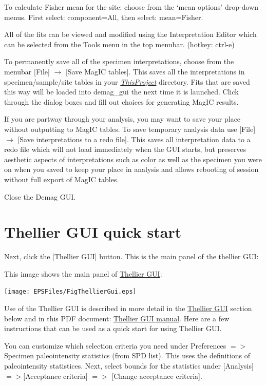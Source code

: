 \documentclass[11pt]{book}
\begin{document}
{{To calculate  Fisher mean for the site: choose from the `mean options' drop-down menus.  First select: component=All, then select: mean=Fisher.

All of the fits can be viewed and modified using the Interpretation Editor which can be selected from the Tools menu in the top menubar. (hotkey: ctrl-e)

To permanently save all of the specimen interpretations, choose from the menubar [File] $\rightarrow$ [Save MagIC  tables]. This saves all the interpretations in specimen/sample/site tables in your \href{#Project_Directory}{\it ThisProject} directory. Fits that are saved this way will be loaded into demag\_gui the next time it is launched.  Click through the dialog boxes and fill out choices for generating MagIC results.

If you are partway through your analysis, you may want to save your place without outputting to MagIC tables.  To save temporary analysis data use [File] $\rightarrow$ [Save interpretations to a redo file]. This saves all interpretation data to a redo file which will not load immediately when the GUI starts, but preserves aesthetic aspects of interpretations such as color as well as the specimen you were on when you saved to keep your place in analysis and allows rebooting of session without full export of MagIC tables.

Close the Demag GUI.



\section{Thellier GUI quick start}
Next, click the [Thellier GUI] button.  This is the main panel of the thellier GUI:

This image shows the main panel of \href{#ThellierGUI}{Thellier GUI}:

\texttt{[image: EPSFiles/FigThellierGui.eps]}

Use of the Thellier GUI is described in more detail in the \href{#thellier_GUI.py}{Thellier GUI} section below and in this PDF document: \href{https://github.com/PmagPy/PmagPy-Cookbook/blob/gh-pages/thellier_GUI_full_manual.pdf}{Thellier GUI manual}. Here are a few instructions that can be used as a quick start for using Thellier GUI.

You can customize which selection criteria you need  under Preferences $=>$ Specimen paleointensity statistics (from SPD list).  This uses the \cite{paterson14} definitions of paleointensity statistices.
Next, select bounds for the statistics under [Analysis] $=>$[Acceptance criteria] $=>$ [Change acceptance criteria].

}}
\end{document}
